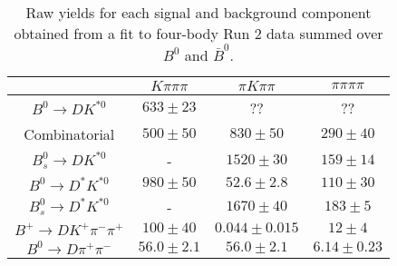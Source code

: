 \begin{table}
  \centering
  \begin{tabular}{cccc}
      \toprule
       & $K\pi\pi\pi$ & $\pi K\pi\pi$ & $\pi\pi\pi\pi$ \\
      \midrule
      $B^0 \to DK^{*0}$ & $633 \pm 23$ & ?? & ?? \\
      Combinatorial & $500 \pm 50$ & $830 \pm 50$ & $290 \pm 40$ \\
      $B^0_s \to DK^{*0}$ & \-- & $1520 \pm 30$ & $159 \pm 14$ \\
      $B^0 \to D^*K^{*0}$ & $980 \pm 50$ & $52.6 \pm 2.8$ & $110 \pm 30$ \\
      $B^0_s \to D^*K^{*0}$ & \-- & $1670 \pm 40$ & $183 \pm 5$ \\
      $B^+ \to DK^+\pi^-\pi^+$ & $100 \pm 40$ & $0.044 \pm 0.015$ & $12 \pm 4$ \\
      $B^0 \to D\pi^+\pi^-$ & $56.0 \pm 2.1$ & $56.0 \pm 2.1$ & $6.14 \pm 0.23$ \\
      \bottomrule
      \end{tabular}
  \caption{Raw yields for each signal and background component obtained from a fit to four-body Run 2 data summed over $B^0$ and $\bar{B}^0$.}
\label{tab:yields_combined_4body_run2}
\end{table}
